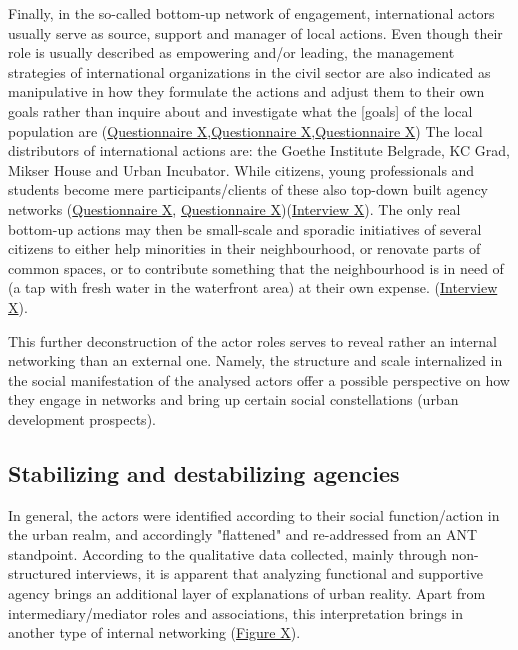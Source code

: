 \documentclass[11pt]{report}
\begin{document}
Finally, in the so-called bottom-up network of engagement, international actors usually serve as source, support and manager of local actions.
Even though their role is usually described as empowering and/or leading, the management strategies of international organizations in the civil sector are also indicated as manipulative in how they formulate the actions and adjust them to their own goals rather than inquire about and investigate what the [goals] of the local  population are (\href{Questionnaire Experts Savamala}{Questionnaire X},\href{Questionnaire PhD Savamala}{Questionnaire X},\href{Questionnaire Student Savamala}{Questionnaire X})
The local distributors of international actions are: the Goethe Institute Belgrade, KC Grad, Mikser House and Urban Incubator.
While citizens, young professionals and students become mere participants/clients of these also top-down built agency networks (\href{Questionnaire Experts Savamala}{Questionnaire X}, \href{Questionnaire Students Savamala}{Questionnaire X})(\href{InterviewX}{Interview X}).
The only real bottom-up actions may then be small-scale and sporadic initiatives of several citizens to either help minorities in their neighbourhood, or renovate parts of common spaces, or to contribute  something that the neighbourhood is in need of (a tap with fresh water in the waterfront area) at their own expense. (\href{InterviewX}{Interview X}).

This further deconstruction of the actor roles serves to reveal rather an internal networking than an external one. Namely, the structure and scale internalized in the social manifestation of the analysed actors offer a possible perspective on how they engage in networks and bring up certain social constellations (urban development prospects).

\subsection{Stabilizing and destabilizing agencies}

In general, the actors were identified according to their social function/action in the urban realm, and accordingly "flattened" and re-addressed from an ANT standpoint. According to the qualitative data collected, mainly through non-structured interviews, it is apparent that analyzing functional and supportive agency brings an additional layer of explanations of urban reality. Apart from intermediary/mediator roles and associations, this interpretation brings in another type of internal networking (\href{Figure 7}{Figure X}).
\\
\end{document}
